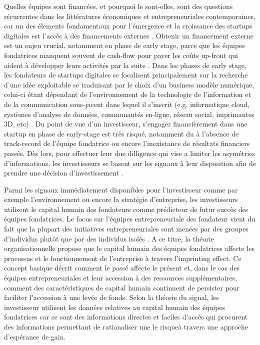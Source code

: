 \documentclass[12pt]{article}
\begin{document}
Quelles équipes sont financées, et pourquoi le sont-elles, sont des questions récurrentes dans les littératures économiques et entrepreneuriales contemporaines, car un des élements fondamentaux pour l'émergence et la croissance des startups digitales est l'accès à des financements externes \citep{ratzinger2018impact, klein2020start}. Obtenir un financement externe est un enjeu crucial, notamment en phase de early stage, parce que les équipes fondatrices manquent souvent de cash-flow pour payer les coûts up-front qui aident à développer leurs activités par la suite \citep{ratzinger2018impact}. Dans les phases de early stage, les fondateurs de startups digitales se focalisent principalement sur la recherche d'une idée exploitable se traduisant par le choix d'un business modèle numérique, celui-ci étant dépendant de l'environnement de la technologie de l’information et de la communication sous-jacent dans lequel il s'inscrit (e.g. informatique cloud, systèmes d’analyse de données, communautés en-ligne, réseau social, imprimantes 3D, etc) \citep{nambisan2017digital}. Du point de vue d'un investisseur, s'engager financièrement dans une startup en phase de early-stage est très risqué, notamment du à l'absence de track-record de l'équipe fondatrice ou encore l'inexistance de résultats financiers passés. Dès lors, pour effectuer leur due dilligence qui vise a limiter les asymétries d'informations, les investisseurs se basent sur les signaux à leur disposition afin de prendre une décision d'investissement \citep{colombo2021use, ko2018signaling, spence1974market}.

Parmi les signaux immédiatement disponibles pour l'investisseur comme par exemple l'environnement ou encore la stratégie d'entreprise, les investisseurs utilisent le capital humain des fondateurs comme prédicteur de futur succès des équipes fondatrices. Le focus sur l'équipes entrepreneuriale des fondateur vient du fait que la plupart des initiatives entrepreneuriales sont menées par des groupes d'individus plutôt que par des individus isolés \citep{roure1990predictors, klotz2014new}. A ce titre, la théorie organisationnelle propose que le capital humain des équipes fondatrices affecte les processus et le fonctionnement de l'entreprise à travers l'imprinting effect. Ce concept basique décrit comment le passé affecte le présent et, dans le cas des équipes entrepreneuriales et leur accession à des ressources supplémentaires, comment des caractéristiques de capital humain continuent de persister pour faciliter l'accession à une levée de fonds. Selon la théorie du signal, les investisseur utilisent les données relatives au capital humain des équipes fondatrices car ce sont des informations directes et faciles d'accès qui procurent des informations permettant de rationaliser une le risqueà travers une approche d'espérance de gain.
\end{document}
